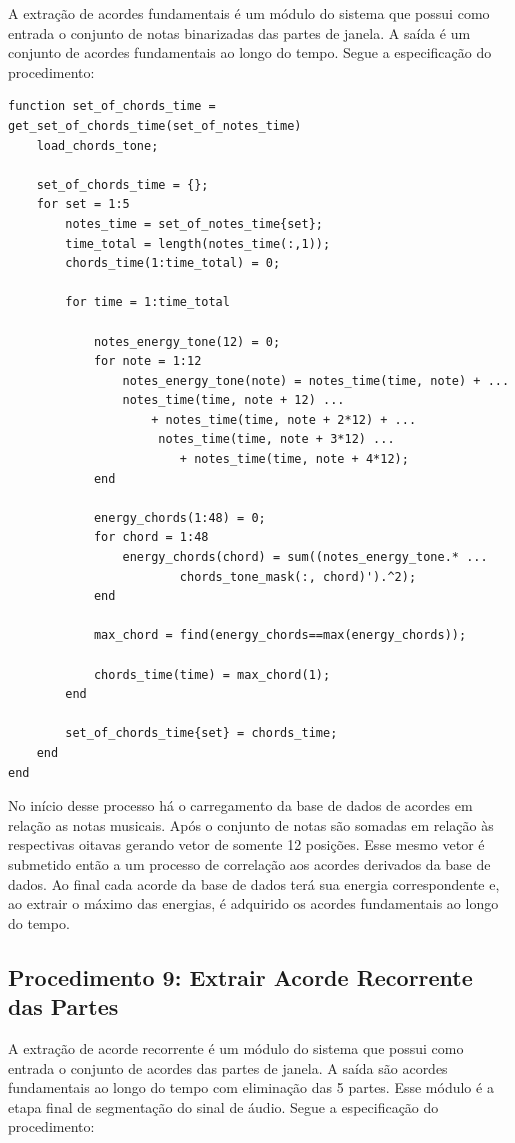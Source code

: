 A extração de acordes fundamentais é um módulo do sistema que possui como entrada o conjunto de notas binarizadas das partes de janela. A saída é um conjunto de acordes fundamentais ao longo do tempo. Segue a especificação do procedimento:
\begin{lstlisting}
function set_of_chords_time = get_set_of_chords_time(set_of_notes_time)
	load_chords_tone;

	set_of_chords_time = {};
	for set = 1:5
		notes_time = set_of_notes_time{set};
		time_total = length(notes_time(:,1));
		chords_time(1:time_total) = 0;

		for time = 1:time_total
			
			notes_energy_tone(12) = 0;
			for note = 1:12
				notes_energy_tone(note) = notes_time(time, note) + ... 
				notes_time(time, note + 12) ...
					+ notes_time(time, note + 2*12) + ...
					 notes_time(time, note + 3*12) ...
						+ notes_time(time, note + 4*12);
			end

			energy_chords(1:48) = 0;
		    for chord = 1:48
		        energy_chords(chord) = sum((notes_energy_tone.* ...
		        		chords_tone_mask(:, chord)').^2);
		    end
		    
		    max_chord = find(energy_chords==max(energy_chords));

		    chords_time(time) = max_chord(1);
		end

		set_of_chords_time{set} = chords_time;
	end
end
\end{lstlisting}

No início desse processo há o carregamento da base de dados de acordes em relação as notas musicais. Após o conjunto de notas são somadas em relação às respectivas oitavas gerando vetor de somente 12 posições. Esse mesmo vetor é submetido então a um processo de correlação aos acordes derivados da base de dados. Ao final cada acorde da base de dados terá sua energia correspondente e, ao extrair o máximo das energias, é adquirido os acordes fundamentais ao longo do tempo.

\subsection{Procedimento 9: Extrair Acorde Recorrente das Partes}

A extração de acorde recorrente é um módulo do sistema que possui como entrada o conjunto de acordes das partes de janela. A saída são acordes fundamentais ao longo do tempo com eliminação das 5 partes. Esse módulo é a etapa final de segmentação do sinal de áudio. Segue a especificação do procedimento:

